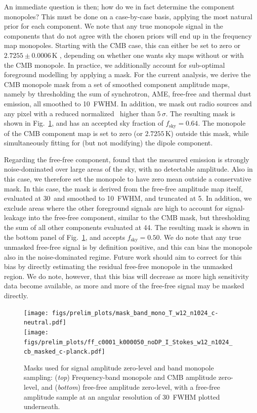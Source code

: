 \documentclass[twocolumn]{aa}
\begin{document}
An immediate question is then; how do we in fact determine
the component monopoles? This must be done on a case-by-case basis,
applying the most natural prior for each component.
We note that any true monopole signal in the components that
do not agree with the chosen priors will end up in the frequency
map monopoles.
Starting with the CMB case, this can either be set to zero or
$2.7255\pm0.0006\,\mathrm{K}$ \citep{fixsen2009}, depending on whether
one wants sky maps without or with the CMB monopole. In practice, we
additionally account for sub-optimal foreground modelling by applying a
mask. For the current analysis, we derive the CMB monopole mask from a
set of smoothed component amplitude maps, namely by thresholding the
sum of synchrotron, AME, free-free and thermal dust emission, all
smoothed to 10\deg\ FWHM. In addition, we mask out radio sources and
any pixel with a reduced normalized \chisq\ higher than
$5\,\sigma$. The resulting mask is shown in
Fig.~\ref{fig:monopole_masks}, and has an accepted sky fraction of
$f_{\mathrm{sky}}=0.64$. The monopole of the CMB component map is set
to zero (or $2.7255\,\mathrm{K}$) outside this mask,
while simultaneously fitting for (but not
modifying) the dipole component.

Regarding the free-free component, \citet{planck2014-a12} found that
the measured emission is strongly noise-dominated over large areas of
the sky, with no detectable amplitude. Also in this case, we therefore
set the monopole to have zero mean outside a conservative mask.  In
this case, the mask is derived from the free-free amplitude map
itself, evaluated at 30\GHz\ and smoothed to 10\deg\ FWHM, and
truncated at 5\muKRJ. In addition, we exclude areas where the other
foreground signals are high to account for signal-leakage into the
free-free component, similar to the CMB mask, but thresholding the sum
of all other components evaluated at 44\GHz. The resulting mask is
shown in the bottom panel of Fig.~\ref{fig:monopole_masks}, and
accepts $f_{\mathrm{sky}}=0.50$. We do note that any true unmasked
free-free signal is by definition positive, and this can bias the
monopole also in the noise-dominated regime. Future work should aim to
correct for this bias by directly estimating the residual free-free
monopole in the unmasked region. We do note, however, that this
bias will decrease as more high sensitivity data become available, as
more and more of the free-free signal may be masked directly. 

\begin{figure}
  \center	
  \texttt{[image: figs/prelim\_plots/mask\_band\_mono\_T\_w12\_n1024\_c-neutral.pdf]}\\
  \texttt{[image: figs/prelim\_plots/ff\_c0001\_k000050\_noDP\_I\_Stokes\_w12\_n1024\_cb\_masked\_c-planck.pdf]}\\
  \caption{Masks used for signal amplitude zero-level and band monopole sampling:
    (\emph{top}) Frequency-band monopole and CMB amplitude zero-level, and
    (\emph{bottom}) free-free amplitude zero-level, with a free-free amplitude
    sample at an angular resolution of 30\arcm\ FWHM plotted underneath.
  }
  \label{fig:monopole_masks}
\end{figure}
\end{document}

